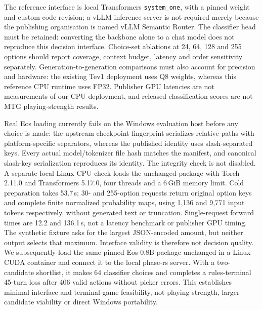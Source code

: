 \documentclass[11pt,a4paper]{article}
\theoremstyle{definition}
\theoremstyle{plain}
\begin{document}
The reference interface is local Transformers \texttt{system\_one}, with a
pinned weight and custom-code revision; a vLLM inference server is not
required merely because the publishing organisation is named vLLM Semantic
Router. The classifier head must be retained: converting the backbone alone
to a chat model does not reproduce this decision interface. Choice-set
ablations at 24, 64, 128 and 255 options should report coverage, context
budget, latency and order sensitivity separately. Generation-to-generation
comparisons must also account for precision and hardware: the existing
Tev1 deployment uses Q8 weights, whereas this reference CPU runtime uses
FP32. Publisher GPU latencies are not measurements of our CPU deployment,
and released classification scores are not MTG playing-strength results.

Real Eos loading currently fails on the Windows evaluation host before any
choice is made: the upstream checkpoint fingerprint serializes relative
paths with platform-specific separators, whereas the published identity
uses slash-separated keys. Every actual model/tokenizer file hash matches
the manifest, and canonical slash-key serialization reproduces its identity.
The integrity check is not disabled. A separate local Linux CPU check loads
the unchanged package with Torch 2.11.0 and Transformers 5.17.0, four threads
and a 6\,GiB memory limit. Cold preparation takes 53.7\,s; 30- and 255-option
requests return original option keys and complete finite normalized
probability maps, using 1,136 and 9,771 input tokens respectively, without
generated text or truncation. Single-request forward times are 12.2 and
136.1\,s, not a latency benchmark or publisher GPU timing.
The synthetic fixture asks for the largest JSON-encoded amount, but neither
output selects that maximum. Interface validity is therefore not decision
quality. We subsequently load the same pinned Eos 0.8B package unchanged in a
Linux CUDA container and connect it to the local phase-rs server. With a
two-candidate shortlist, it makes 64 classifier choices and completes a
rules-terminal 45-turn loss after 406 valid actions without picker errors.
This establishes minimal interface and terminal-game feasibility, not
playing strength, larger-candidate viability or direct Windows portability.
\end{document}
